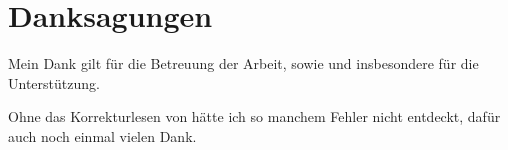 \chapter*{Danksagungen}

Mein Dank gilt \thesisAdvisor{} für die Betreuung der Arbeit, sowie \thesisCompany{} und insbesondere \thesisAdvisorSprd{} für die Unterstützung.

Ohne das Korrekturlesen von \thesisProofreader{} hätte ich so manchem Fehler nicht entdeckt, dafür auch noch einmal vielen Dank.

